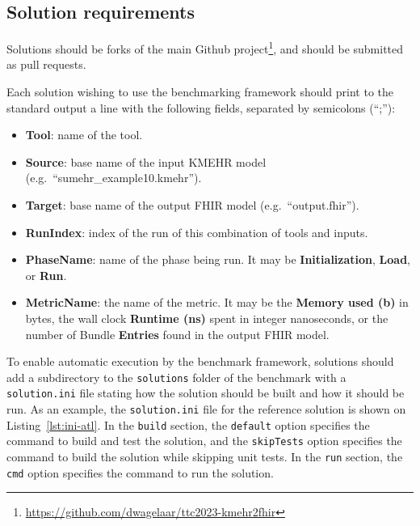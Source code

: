 \documentclass[a4paper]{scrartcl}
\newcommand*{\file}[1]{\texttt{#1}}
\begin{document}
\subsection{Solution requirements}
\label{sec:solut-requ}

Solutions should be forks of the main Github
project\footnote{\url{https://github.com/dwagelaar/ttc2023-kmehr2fhir}},
and should be submitted as pull requests.

Each solution wishing to use the benchmarking framework should print to the
standard output a line with the following fields, separated by semicolons
(``;''):

\begin{itemize}
\item \textbf{Tool}: name of the tool.
\item \textbf{Source}: base name of the input KMEHR model (e.g.\ ``sumehr\_example10.kmehr'').
\item \textbf{Target}: base name of the output FHIR model (e.g.\ ``output.fhir'').
\item \textbf{RunIndex}: index of the run of this combination of tools and inputs.
\item \textbf{PhaseName}: name of the phase being run. It may be \textbf{Initialization},
  \textbf{Load}, or \textbf{Run}.
\item \textbf{MetricName}: the name of the metric. It may be the
  \textbf{Memory used (b)} in bytes, the wall clock \textbf{Runtime (ns)} spent in integer
  nanoseconds, or the number of Bundle \textbf{Entries} found in the
  output FHIR model.
\end{itemize}



To enable automatic execution by the benchmark framework, solutions should add a
subdirectory to the \file{solutions} folder of the benchmark with a
\file{solution.ini} file stating how the solution should be built and how it
should be run. As an example, the \file{solution.ini} file for the reference
solution is shown on Listing~\ref{lst:ini-atl}. In the \file{build} section, the
\file{default} option specifies the command to build and test the solution, and
the \file{skipTests} option specifies the command to build the solution while
skipping unit tests. In the \file{run} section, the \file{cmd} option specifies
the command to run the solution.
\end{document}
